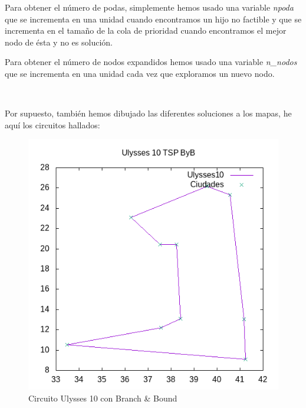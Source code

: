 \documentclass{article}
\begin{document}
	Para obtener el número de podas, simplemente hemos usado una variable \textit{npoda} que se incrementa en una unidad cuando encontramos un hijo no factible y que se incrementa en el tamaño de la cola de prioridad cuando encontramos el mejor nodo de ésta y no es solución.
	\
	
	Para obtener el número de nodos expandidos hemos usado una variable \textit{n\_nodos} que se incrementa en una unidad cada vez que exploramos un nuevo nodo.
	
	\
	
	Por supuesto, también hemos dibujado las diferentes soluciones a los mapas, he aquí los circuitos hallados:
	
	\begin{figure}[H]
		\centering
		\includegraphics[totalheight=6cm]{ulysses10byb}
		\caption{Circuito Ulysses 10 con Branch \& Bound}
		\label{fig:u10byb}
	\end{figure}
\end{document}
